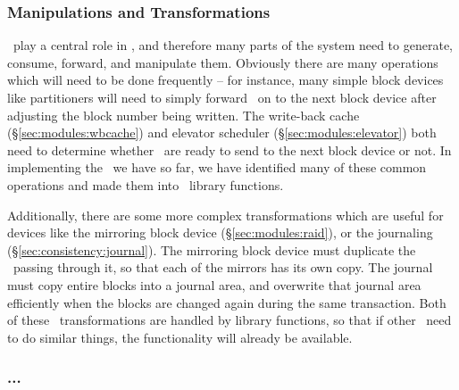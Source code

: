 \subsubsection {Manipulations and Transformations}
\Chdescs\ play a central role in \Kudos, and therefore many parts of the system
need to generate, consume, forward, and manipulate them. Obviously there are
many operations which will need to be done frequently -- for instance, many
simple block devices like partitioners will need to simply forward \chdescs\ on
to the next block device after adjusting the block number being written. The
write-back cache (\S\ref{sec:modules:wbcache}) and elevator scheduler
(\S\ref{sec:modules:elevator}) both need to determine whether \chdescs\ are
ready to send to the next block device or not. In implementing the \modules\ we
have so far, we have identified many of these common operations and made them
into \chdesc\ library functions.

Additionally, there are some more complex transformations which are useful for
devices like the mirroring block device (\S\ref{sec:modules:raid}), or the
journaling \module (\S\ref{sec:consistency:journal}). The mirroring block device
must duplicate the \chdescs\ passing through it, so that each of the mirrors has
its own copy. The journal must copy entire blocks into a journal area, and
overwrite that journal area efficiently when the blocks are changed again during
the same transaction. Both of these \chdesc\ transformations are handled by
library functions, so that if other \modules\ need to do similar things, the
functionality will already be available.

\subsubsection {...}
